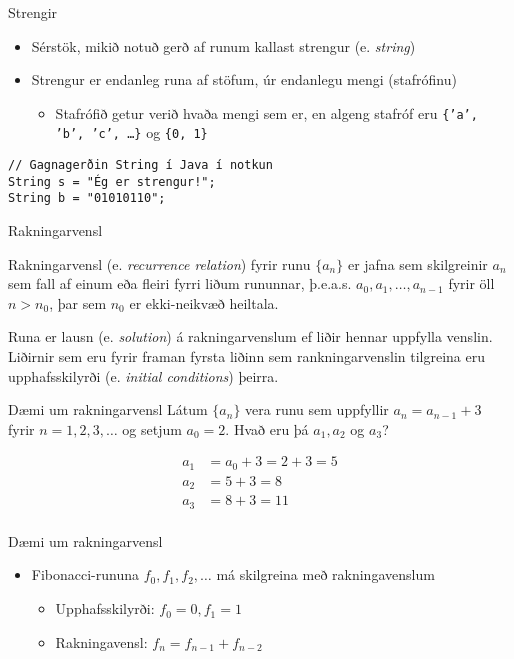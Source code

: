 \documentclass{beamer}
\begin{document}
\begin{frame}[fragile]{Strengir}
\begin{itemize}
 \item Sérstök, mikið notuð gerð af runum kallast strengur (e. \emph{string})
 \item Strengur er endanleg runa af stöfum, úr endanlegu mengi (stafrófinu)
 \begin{itemize}
  \item Stafrófið getur verið hvaða mengi sem er, en algeng stafróf eru \texttt{\{'a', 'b', 'c', \ldots\}} og \texttt{\{0, 1\}}
 \end{itemize}
\end{itemize}

\begin{verbatim}
// Gagnagerðin String í Java í notkun
String s = "Ég er strengur!";
String b = "01010110";
\end{verbatim}
\end{frame}

\begin{frame}{Rakningarvensl}
\begin{tcolorbox}[title=Rakningarvensl]
Rakningarvensl (e. \emph{recurrence relation}) fyrir runu $\{a_n\}$ er jafna sem skilgreinir $a_n$ sem fall af einum eða fleiri fyrri liðum rununnar, þ.e.a.s. $a_0, a_1, \ldots, a_{n-1}$ fyrir öll $n > n_0$, þar sem $n_0$ er ekki-neikvæð heiltala.
\end{tcolorbox}
Runa er lausn (e. \emph{solution}) á rakningarvenslum ef liðir hennar uppfylla venslin. Liðirnir sem eru fyrir framan fyrsta liðinn sem rankningarvenslin tilgreina eru upphafsskilyrði (e. \emph{initial conditions}) þeirra.
\end{frame}

\begin{frame}{Dæmi um rakningarvensl}
Látum $\{a_n\}$ vera runu sem uppfyllir $a_n = a_{n-1} + 3$ fyrir $n=1, 2, 3, \ldots$ og setjum $a_0 = 2$. Hvað eru þá $a_1, a_2$ og $a_3$? \pause

\begin{align*}
a_1 &= a_0 + 3 = 2 + 3 = 5\\
a_2 &= 5 + 3 = 8\\
a_3 &= 8 + 3 = 11\\
\end{align*}

\end{frame}

\begin{frame}{Dæmi um rakningarvensl}
\begin{itemize}
 \item Fibonacci-rununa $f_0, f_1, f_2, \ldots$ má skilgreina með rakningavenslum
 \begin{itemize}
  \item Upphafsskilyrði: $f_0 = 0, f_1 = 1$
  \item Rakningavensl: $f_n = f_{n-1} + f_{n-2}$
 \end{itemize}
\end{itemize}
\end{frame}
\end{document}

